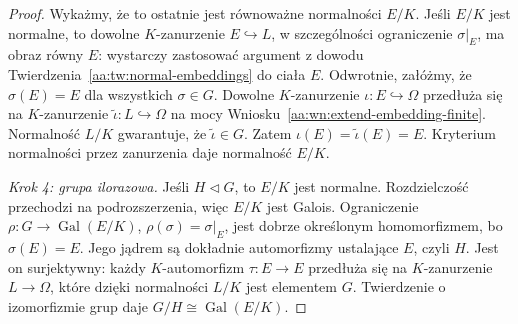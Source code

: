 \begin{proof}
Wykażmy, że to ostatnie jest równoważne normalności
$E/K$. Jeśli $E/K$ jest normalne, to dowolne
$K$-zanurzenie $E\hookrightarrow L$, w szczególności
ograniczenie $\sigma|_E$, ma obraz równy $E$:
wystarczy zastosować argument z dowodu
Twierdzenia~\ref{aa:tw:normal-embeddings} do ciała $E$.
Odwrotnie, załóżmy, że $\sigma(E)=E$ dla wszystkich
$\sigma\in G$. Dowolne $K$-zanurzenie
$\iota:E\hookrightarrow\Omega$ przedłuża się na
$K$-zanurzenie $\widetilde\iota:L\hookrightarrow\Omega$
na mocy Wniosku~\ref{aa:wn:extend-embedding-finite}.
Normalność $L/K$ gwarantuje, że
$\widetilde\iota\in G$. Zatem
$\iota(E)=\widetilde\iota(E)=E$.
Kryterium normalności przez zanurzenia daje
normalność $E/K$.

\emph{Krok 4: grupa ilorazowa.} Jeśli $H\triangleleft G$,
to $E/K$ jest normalne. Rozdzielczość przechodzi
na podrozszerzenia, więc $E/K$ jest Galois.
Ograniczenie
$\rho:G\to\operatorname{Gal}(E/K)$,
$\rho(\sigma)=\sigma|_E$, jest dobrze określonym
homomorfizmem, bo $\sigma(E)=E$. Jego jądrem są
dokładnie automorfizmy ustalające $E$, czyli $H$.
Jest on surjektywny: każdy $K$-automorfizm $\tau:E\to E$
przedłuża się na $K$-zanurzenie $L\to\Omega$,
które dzięki normalności $L/K$ jest elementem $G$.
Twierdzenie o izomorfizmie grup daje
$G/H\cong\operatorname{Gal}(E/K)$.
\end{proof}

